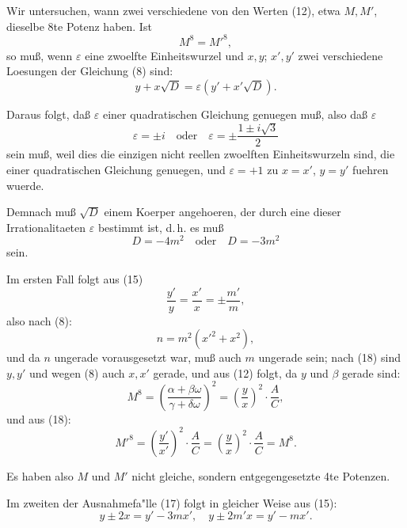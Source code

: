 \documentclass[12pt,a4paper]{article}
\theoremstyle{plain}
\theoremstyle{definition}
\theoremstyle{remark}
\begin{document}
Wir untersuchen, wann zwei verschiedene von den Werten (12), etwa $M, M'$, dieselbe 8te Potenz haben. Ist
\begin{equation}\label{eq:136_14}
M^8 = M'^8,
\end{equation}
so mu\ss{}, wenn $\varepsilon$ eine zwoelfte Einheitswurzel und $x, y$; $x', y'$ zwei verschiedene Loesungen der Gleichung (8) sind:
\begin{equation}\label{eq:136_15}
y + x\sqrt{D} = \varepsilon(y' + x'\sqrt{D}).
\end{equation}

Daraus folgt, da\ss{} $\varepsilon$ einer quadratischen Gleichung genuegen mu\ss{}, also da\ss{} $\varepsilon$
\begin{equation}\label{eq:136_16}
\varepsilon = \pm i \quad \text{oder} \quad \varepsilon = \pm \frac{1 \pm i\sqrt{3}}{2}
\end{equation}
sein mu\ss{}, weil dies die einzigen nicht reellen zwoelften Einheitswurzeln sind, die einer quadratischen Gleichung genuegen, und $\varepsilon = +1$ zu $x = x'$, $y = y'$ fuehren wuerde.

Demnach mu\ss{} $\sqrt{D}$ einem Koerper angehoeren, der durch eine dieser Irrationalitaeten $\varepsilon$ bestimmt ist, d.\,h. es mu\ss{}
\begin{equation}\label{eq:136_17}
D = -4m^2 \quad \text{oder} \quad D = -3m^2
\end{equation}
sein.

Im ersten Fall folgt aus (15)
\begin{equation}\label{eq:136_18}
\frac{y'}{y} = \frac{x'}{x} = \pm \frac{m'}{m},
\end{equation}
also nach (8):
\[
n = m^2(x'^2 + x^2),
\]
und da $n$ ungerade vorausgesetzt war, mu\ss{} auch $m$ ungerade sein; nach (18) sind $y, y'$ und wegen (8) auch $x, x'$ gerade, und aus (12) folgt, da $y$ und $\beta$ gerade sind:
\[
M^8 = \left(\frac{\alpha + \beta\omega}{\gamma + \delta\omega}\right)^2 = \left(\frac{y}{x}\right)^2 \cdot \frac{A}{C},
\]
und aus (18):
\[
M'^8 = \left(\frac{y'}{x'}\right)^2 \cdot \frac{A}{C} = \left(\frac{y}{x}\right)^2 \cdot \frac{A}{C} = M^8.
\]

Es haben also $M$ und $M'$ nicht gleiche, sondern entgegengesetzte 4te Potenzen.

Im zweiten der Ausnahmefa"lle (17) folgt in gleicher Weise aus (15):
\begin{equation}\label{eq:136_20}
y \pm 2x = y' - 3mx', \quad y \pm 2m'x = y' - mx'.
\end{equation}
\end{document}
